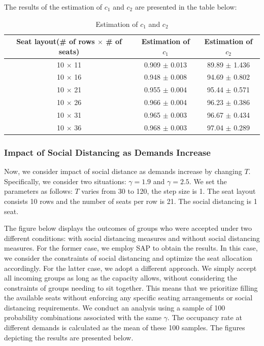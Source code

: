 The results of the estimation of $c_1$ and $c_2$ are presented in the table below:

\begin{table}[ht]
  \centering
  \caption{Estimation of $c_1$ and $c_2$}
  \begin{tabular}{|c|c|c|}
  \hline
   Seat layout(\# of rows $\times$ \# of seats) & Estimation of $c_1$ & Estimation of $c_2$  \\
  \hline
   10 $\times$ 11 & 0.909 $\pm$ 0.013  & 89.89 $\pm$ 1.436 \\
   10 $\times$ 16 & 0.948 $\pm$ 0.008  & 94.69 $\pm$ 0.802 \\
   10 $\times$ 21 & 0.955 $\pm$ 0.004 & 95.44 $\pm$ 0.571 \\
   10 $\times$ 26 & 0.966 $\pm$ 0.004 & 96.23 $\pm$ 0.386 \\
   10 $\times$ 31 & 0.965 $\pm$ 0.003 & 96.67 $\pm$ 0.434 \\
   10 $\times$ 36 & 0.968 $\pm$ 0.003 & 97.04 $\pm$ 0.289 \\
   \hline
  \end{tabular}
\end{table}




\subsubsection{Impact of Social Distancing as Demands Increase}
Now, we consider impact of social distance as demands increase by changing $T$. Specifically, we consider two situations: $\gamma = 1.9$ and $\gamma = 2.5$. We set the parameters as follows: $T$ varies from 30 to 120, the step size is 1.  The seat layout consists 10 rows and the number of seats per row is 21. The social distancing is 1 seat.

The figure below displays the outcomes of groups who were accepted under two different conditions: with social distancing measures and without social distancing measures. For the former case, we employ SAP to obtain the results. In this case, we consider the constraints of social distancing and optimize the seat allocation accordingly. For the latter case, we adopt a different approach. We simply accept all incoming groups as long as the capacity allows, without considering the constraints of groups needing to sit together. This means that we prioritize filling the available seats without enforcing any specific seating arrangements or social distancing requirements. We conduct an analysis using a sample of 100 probability combinations associated with the same $\gamma$. The occupancy rate at different demands is calculated as the mean of these 100 samples. The figures depicting the results are presented below.


